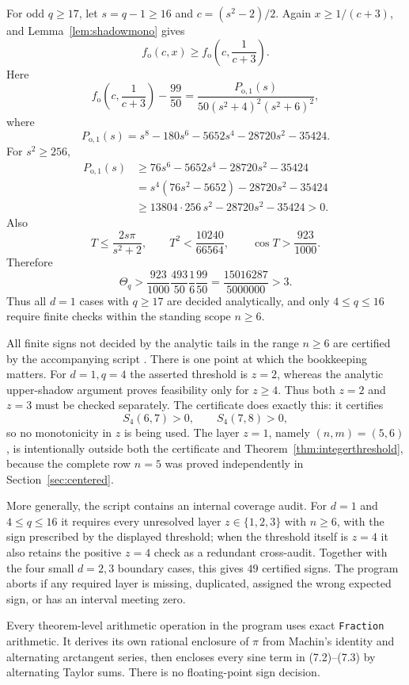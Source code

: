 \documentclass[11pt]{article}
\theoremstyle{remark}
\begin{document}
For odd \(q\ge17\), let \(s=q-1\ge16\) and
\(c=(s^2-2)/2\).  Again
\(x\ge1/(c+3)\), and Lemma~\ref{lem:shadowmono} gives
\[
f_{\mathrm o}(c,x)\ge f_{\mathrm o}\!\left(c,\frac1{c+3}\right).
\]
Here
\[
f_{\mathrm o}\!\left(c,\frac1{c+3}\right)-\frac{99}{50}
=
\frac{P_{\mathrm o,1}(s)}
{50(s^2+4)^2(s^2+6)^2},
\tag{8.13}
\]
where
\[
P_{\mathrm o,1}(s)
=s^8-180s^6-5652s^4-28720s^2-35424.
\]
For \(s^2\ge256\),
\[
\begin{aligned}
P_{\mathrm o,1}(s)
&\ge76s^6-5652s^4-28720s^2-35424\\
&=s^4(76s^2-5652)-28720s^2-35424\\
&\ge13804\cdot256\,s^2-28720s^2-35424>0.
\end{aligned}
\tag{8.14}
\]
Also
\[
T\le\frac{2s\pi}{s^2+2},
\qquad
T^2<\frac{10240}{66564},
\qquad
\cos T>\frac{923}{1000}.
\]
Therefore
\[
\Theta_q>
\frac{923}{1000}\frac{493}{50}\frac1{6}\frac{99}{50}
=\frac{15016287}{5000000}>3.
\tag{8.15}
\]
Thus all \(d=1\) cases with \(q\ge17\) are decided analytically, and only
\(4\le q\le16\) require finite checks within the standing scope \(n\ge6\).

All finite signs not decided by the analytic tails in the range $n\ge6$ are certified by the accompanying script . There is one point at which the bookkeeping matters. For $d=1,q=4$ the asserted threshold is $z=2$, whereas the analytic upper-shadow argument proves feasibility only for $z\ge4$. Thus both $z=2$ and $z=3$ must be checked separately. The certificate does exactly this: it certifies
\[
 S_4(6,7)>0,\qquad S_4(7,8)>0,
\]
so no monotonicity in $z$ is being used. The layer $z=1$, namely $(n,m)=(5,6)$, is intentionally outside both the certificate and Theorem~\ref{thm:integerthreshold}, because the complete row $n=5$ was proved independently in Section~\ref{sec:centered}.

More generally, the script contains an internal coverage audit. For $d=1$ and $4\le q\le16$ it requires every unresolved layer $z\in\{1,2,3\}$ with $n\ge6$, with the sign prescribed by the displayed threshold; when the threshold itself is $z=4$ it also retains the positive $z=4$ check as a redundant cross-audit. Together with the four small $d=2,3$ boundary cases, this gives $49$ certified signs. The program aborts if any required layer is missing, duplicated, assigned the wrong expected sign, or has an interval meeting zero.

Every theorem-level arithmetic operation in the program uses exact \texttt{Fraction} arithmetic. It derives its own rational enclosure of $\pi$ from Machin's identity and alternating arctangent series, then encloses every sine term in (7.2)--(7.3) by alternating Taylor sums. There is no floating-point sign decision.
\end{document}
